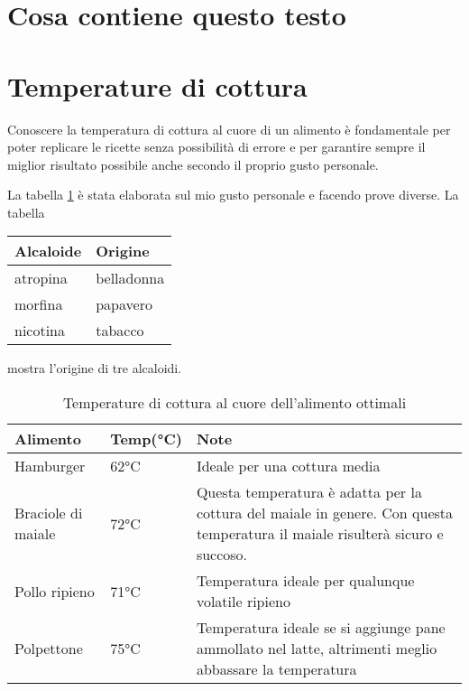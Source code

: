 \section{Cosa contiene questo testo}




\section{Temperature di cottura}
Conoscere la temperatura di cottura al cuore di un alimento è fondamentale per poter replicare le ricette senza possibilità di errore e per garantire sempre il miglior risultato possibile anche secondo il proprio gusto personale.

La tabella \ref{temperature-al-cuore} è stata elaborata sul mio gusto personale e facendo prove diverse.
La tabella
\begin{center}
\begin{tabular}{ll}
\toprule
Alcaloide & Origine \\
\midrule
atropina & belladonna \\
morfina
& papavero \\
nicotina & tabacco \\
\bottomrule
\end{tabular}
\end{center}
mostra l’origine di tre alcaloidi.



\begin{table}
\begin{tabular}{llp{}}
\toprule
Alimento				&	Temp(°C)		&		Note		\\
\midrule
Hamburger			& 	62°C 		& Ideale per una cottura media\\
Braciole di maiale	& 	72°C 		& Questa temperatura è adatta per la cottura del maiale in genere. Con questa temperatura il maiale risulterà sicuro e succoso.\\
Pollo ripieno 		& 	71°C 		& Temperatura ideale per qualunque volatile ripieno\\
Polpettone 			&	75°C 		& Temperatura ideale se si aggiunge pane ammollato nel latte, altrimenti meglio abbassare la temperatura\\
\bottomrule
\end{tabular}
\label{temperature-al-cuore}
\caption{Temperature di cottura al cuore dell'alimento ottimali}
\end{table}

